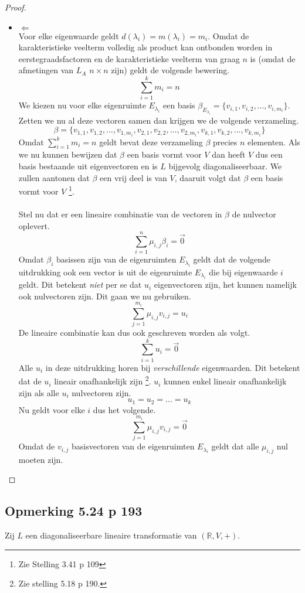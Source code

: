 \documentclass[lineaire_algebra_oplossingen.tex]{subfiles}
\begin{document}
\begin{proof}
\begin{itemize}
\item $\Leftarrow$\\
Voor elke eigenwaarde geldt $d(\lambda_i) = m(\lambda_i) = m_i$.
Omdat de karakteristieke veelterm volledig als product kan ontbonden worden in eerstegraadsfactoren en de karakteristieke veelterm van graag $n$ is (omdat de afmetingen van $L_A$ $n\times
n$ zijn) geldt de volgende bewering.
\[
\sum_{i=1}^km_i = n
\]
We kiezen nu voor elke eigenruimte $E_{\lambda_i}$ een basis $\beta_{E_{\lambda_i}} = \{v_{i,1},v_{i,2},...,v_{i,m_i}\}$. Zetten we nu al deze vectoren samen dan krijgen we de volgende verzameling.
\[
\beta = 
\{
v_{1,1},v_{1,2},...,v_{1,m_i},v_{2,1},v_{2,2},...,v_{2,m_i},v_{k,1},v_{k,2},...,v_{k,m_i}
\}
\]
Omdat $\sum_{i=1}^km_i = n$ geldt bevat deze verzameling $\beta$ precies $n$ elementen.
Als we nu kunnen bewijzen dat $\beta$ een basis vormt voor $V$ dan heeft $V$ dus een basis bestaande uit eigenvectoren en is $L$ bijgevolg diagonaliseerbaar. We zullen aantonen dat $\beta$ een vrij deel is van $V$, daaruit volgt dat $\beta$ een basis vormt voor $V$ \footnote{Zie Stelling 3.41 p 109}.\\\\
Stel nu dat er een lineaire combinatie van de vectoren in $\beta$ de nulvector oplevert.
\[
\sum_{i=1}^n\mu_{i,j}\beta_i = \vec{0}
\]
Omdat $\beta_i$ basissen zijn van de eigenruimten $E_{\lambda_i}$ geldt dat de volgende uitdrukking ook een vector is uit de eigenruimte $E_{\lambda_i}$ die bij eigenwaarde $i$ geldt. Dit betekent \emph{niet} per se dat $u_i$ eigenvectoren zijn, het kunnen namelijk ook nulvectoren zijn. Dit gaan we nu gebruiken.
\[
\sum_{j=1}^{m_i} \mu_{i,j}v_{i,j} = u_i
\]
De lineaire combinatie kan dus ook geschreven worden als volgt.
\[
\sum_{i=1}^ku_i = \vec{0}
\]
Alle $u_i$ in deze uitdrukking horen bij \emph{verschillende} eigenwaarden. Dit betekent dat de $u_i$ lineair onafhankelijk zijn \footnote{Zie stelling 5.18 p 190.}. $u_i$ kunnen enkel lineair onafhankelijk zijn als alle $u_i$ nulvectoren zijn.
\[
u_1 = u_2 = ... = u_k
\]
Nu geldt voor elke $i$ dus het volgende.
\[
\sum_{j=1}^{m_i} \mu_{i,j}v_{i,j} = \vec{0}
\]
Omdat de $v_{i,j}$ basisvectoren van de eigenruimten $E_{\lambda_i}$ geldt dat alle $\mu_{i,j}$ nul moeten zijn.
\end{itemize}
\end{proof}


\subsection{Opmerking 5.24 p 193}
\label{5.24}
Zij $L$ een diagonaliseerbare lineaire transformatie van $(\mathbb{R},V,+)$. 
\end{document}
